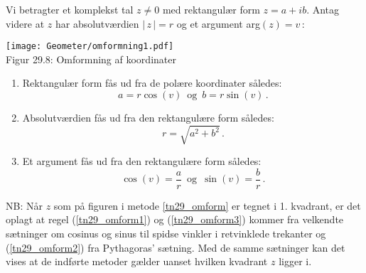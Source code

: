 \begin{method}\label{tn29_omform}
Vi betragter et komplekst tal $z\neq 0$ med rektangulær form $z=a+ib$. Antag videre at $z$ har absolutværdien $|\,z\,|=r$ og et argument arg$(z)=v\,$: 
\begin{center}
	\texttt{[image: Geometer/omformning1.pdf]}\\
Figur 29.8: Omformning af koordinater
\end{center}
\begin{enumerate}
\item
Rektangulær form fås ud fra de polære koordinater således:
\begin{equation}\label{tn29_omform1}
a=r\cos(v)\,\,\,\mathrm{og}\,\,\,b=r\sin(v)\,.
\end{equation}
\item
Absolutværdien fås ud fra den rektangulære form således:
\begin{equation}\label{tn29_omform2}
r=\sqrt{a^2+b^2}\,.
\end{equation}
\item
Et argument fås ud fra den rektangulære form således:
\begin{equation}\label{tn29_omform3}
\cos(v)=\frac a r \,\,\,\mathrm{og}\,\,\,\sin(v)=\frac b r\,. 
\end{equation}
\end{enumerate}
\end{method}
\begin{aha}
NB: Når $z$ som på figuren i metode \ref{tn29_omform} er tegnet i 1. kvadrant, er det oplagt at regel (\ref{tn29_omform1}) og (\ref{tn29_omform3}) kommer fra velkendte sætninger om cosinus og sinus til spidse vinkler i retvinklede trekanter og (\ref{tn29_omform2}) fra Pythagoras' sætning. Med de samme sætninger kan det vises at de indførte metoder gælder uanset hvilken kvadrant $z$ ligger i. 
\end{aha}

